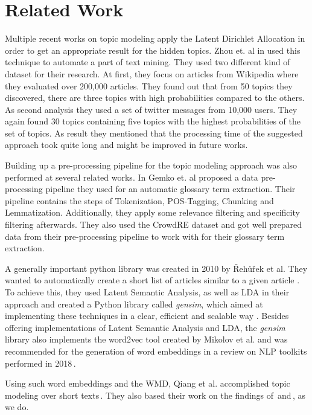 \section{Related Work} %
\label{sec:related_work}

Multiple recent works on topic modeling apply the Latent Dirichlet Allocation in order to get an appropriate result for the hidden topics. Zhou et. al in \cite{zhou_tong_text_2016} used this technique to automate a part of text mining. They used two different kind of dataset for their research. At first, they focus on articles from Wikipedia where they evaluated over 200,000 articles. They found out that from 50 topics they discovered, there are three topics with high probabilities compared to the others. As second analysis they used a set of twitter messages from 10,000 users. They again found 30 topics containing five topics with the highest probabilities of the set of topics. As result they mentioned that the processing time of the suggested approach took quite long and might be improved in future works.

Building up a pre-processing pipeline for the topic modeling approach was also performed at several related works. In \cite{gemkow_automatic_2018}  Gemko et. al proposed a data pre-processing pipeline they used for an automatic glossary term extraction. Their pipeline contains the steps of Tokenization, POS-Tagging, Chunking and Lemmatization. Additionally, they apply some relevance filtering and specificity filtering afterwards. They also used the CrowdRE dataset and got well prepared data from their pre-processing pipeline to work with for their glossary term extraction.

A generally important python library was created in 2010 by {\v R}eh{\r u}{\v r}ek et al. They wanted to automatically create a short list of articles similar to a given article \cite{rehurek_software_2010}. To achieve this, they used Latent Semantic Analysis, as well as LDA in their approach and created a Python library called \emph{gensim}, which aimed at implementing these techniques in a clear, efficient and scalable way \cite{gensim_python}. Besides offering implementations of Latent Semantic Analysis and LDA, the \textit{gensim} library also implements the word2vec tool created by Mikolov et al. and was recommended for the generation of word embeddings in a review on NLP toolkits performed in 2018\,\cite{solangi_review_2018}.

Using such word embeddings and the WMD, Qiang et al. accomplished topic modeling over short texts\,\cite{qiang_topic_2016}. They also based their work on the findings of\,\cite{mikolov_efficient_2013} and\,\cite{kusner_word_2015}, as we do.